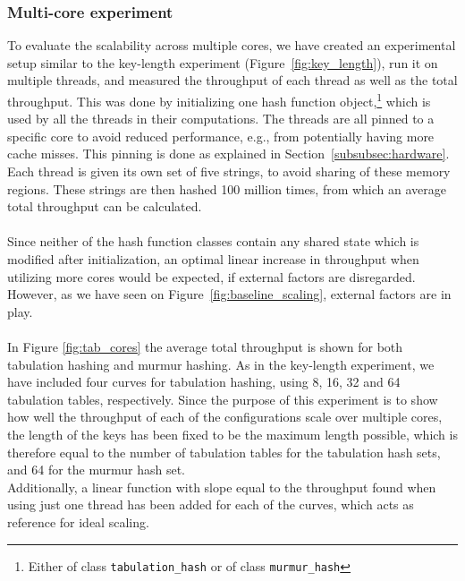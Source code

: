 \documentclass[11pt]{article} %
\begin{document}
\subsubsection{Multi-core experiment}
\label{subsubsec:hash_func_multi_core}
To evaluate the scalability across multiple cores, we have created an experimental setup similar to the key-length experiment (Figure~\ref{fig:key_length}), run it on multiple threads, and measured the throughput of each thread as well as the total throughput. This was done by initializing one hash function object,\footnote{Either of class \verb|tabulation_hash| or of class \verb|murmur_hash|} which is used by all the threads in their computations. The threads are all pinned to a specific core to avoid reduced performance, e.g., from potentially having more cache misses. This pinning is done as explained in Section~\ref{subsubsec:hardware}. Each thread is given its own set of five strings, to avoid sharing of these memory regions. These strings are then hashed 100 million times, from which an average total throughput can be calculated. \\
\\
Since neither of the hash function classes contain any shared state which is modified after initialization, an optimal linear increase in throughput when utilizing more cores would be expected, if external factors are disregarded. However, as we have seen on Figure~\ref{fig:baseline_scaling}, external factors are in play. \\
\\
In Figure \ref{fig:tab_cores} the average total throughput is shown for both tabulation hashing and murmur hashing. As in the key-length experiment, we have included four curves for tabulation hashing, using 8, 16, 32 and 64 tabulation tables, respectively. Since the purpose of this experiment is to show how well the throughput of each of the configurations scale over multiple cores, the length of the keys has been fixed to be the maximum length possible, which is therefore equal to the number of tabulation tables for the tabulation hash sets, and 64 for the murmur hash set. 
\\
Additionally, a linear function with slope equal to the throughput found when using just one thread has been added for each of the curves, which acts as reference for ideal scaling.\\
\end{document}
